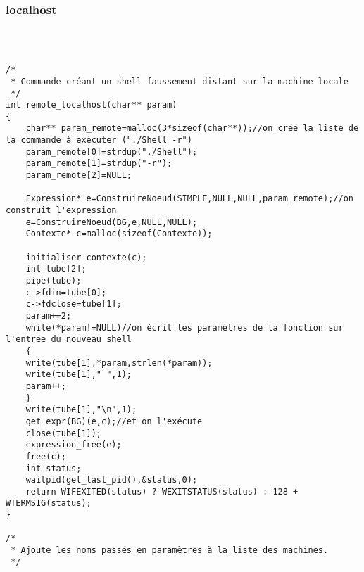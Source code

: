 \documentclass[12pt]{article}
\begin{document}
\subsubsection*{localhost}
\label{localhost}
\begin{verbatim}



/*
 * Commande créant un shell faussement distant sur la machine locale 
 */
int remote_localhost(char** param)
{
    char** param_remote=malloc(3*sizeof(char**));//on créé la liste de la commande à exécuter ("./Shell -r")
    param_remote[0]=strdup("./Shell");
    param_remote[1]=strdup("-r");
    param_remote[2]=NULL;
    
    Expression* e=ConstruireNoeud(SIMPLE,NULL,NULL,param_remote);//on construit l'expression
    e=ConstruireNoeud(BG,e,NULL,NULL);
    Contexte* c=malloc(sizeof(Contexte));
    
    initialiser_contexte(c);
    int tube[2];
    pipe(tube);
    c->fdin=tube[0];
    c->fdclose=tube[1];
    param+=2;
    while(*param!=NULL)//on écrit les paramètres de la fonction sur l'entrée du nouveau shell
    {
	write(tube[1],*param,strlen(*param));
	write(tube[1]," ",1);
	param++;
    }
    write(tube[1],"\n",1);
    get_expr(BG)(e,c);//et on l'exécute
    close(tube[1]);
    expression_free(e);
    free(c);
    int status;
    waitpid(get_last_pid(),&status,0);
    return WIFEXITED(status) ? WEXITSTATUS(status) : 128 + WTERMSIG(status);
}

/* 
 * Ajoute les noms passés en paramètres à la liste des machines.
 */

 \end{verbatim}
\end{document}
